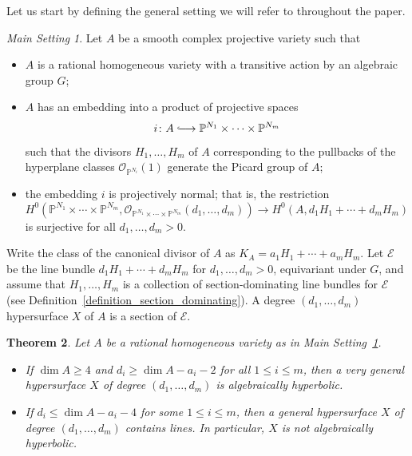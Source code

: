 \documentclass[10pt,a4paper]{article}
\numberwithin{equation}{section}
\newtheorem{theorem}{Theorem}[section]
\theoremstyle{definition}
\theoremstyle{remark}
\newtheorem{setting}[theorem]{Main Setting}
\newcommand{\cO}{\mathcal{O}}
\renewcommand{\P}{\mathbb{P}}
\newcommand{\longhookrightarrow}{\lhook\joinrel\longrightarrow}
\newcommand{\lra}{\longrightarrow}
\begin{document}
\setcounter{section}{1}
\setcounter{theorem}{2}

Let us start by defining the general setting we will refer to throughout the paper.

\begin{setting}\label{main_setting}
    Let $A$ be a smooth complex projective variety such that
    \begin{itemize}
        \item $A$ is a rational homogeneous variety with a transitive action by an algebraic group $G$;
        \item $A$ has an embedding into a product of projective spaces
        \[ i\colon A\longhookrightarrow \P^{N_1}\times \cdots \times \P^{N_m} \]
        such that the divisors $H_1, \hdots , H_m$ of $A$ corresponding to the pullbacks of the hyperplane classes $\cO_{\P^{N_i}}(1)$ generate the Picard group of $A$;
        \item the embedding $i$ is projectively normal; that is, the restriction
        \[ H^0\left (\P^{N_1}\times \cdots \times \P^{N_m}, \cO_{\P^{N_1}\times \cdots \times \P^{N_m}}(d_1,\ldots ,d_m)\right )\lra H^0(A,d_1H_1+\cdots +d_mH_m) \]
        is surjective for all $d_1,\ldots,d_m > 0$.
    \end{itemize}

    Write the class of the canonical divisor of $A$ as $K_A = a_1H_1 + \cdots + a_mH_m$. Let $\mathcal{E}$ be the line bundle $d_1H_1 + \cdots + d_mH_m$ for $d_1,\hdots ,d_m >0$, equivariant under $G$, and assume that $H_1, \hdots , H_m$ is a collection of section-dominating line bundles for $\mathcal{E}$ (see Definition~\ref{definition_section_dominating}). A degree $(d_1, \hdots , d_m)$ hypersurface $X$ of $A$ is a section of $\mathcal{E}$.
\end{setting}


\begin{theorem}\label{main_theorem} Let $A$ be a rational homogeneous variety as in Main Setting~\ref{main_setting}.
    \begin{itemize}
        \item If $\dim A\ge 4$ and $d_i\ge \dim A-a_i-2$ for all $1\le i\le m$, then a very general hypersurface $X$ of degree $(d_1, \hdots, d_m)$ is algebraically hyperbolic.
        \item If $d_i\le \dim A - a_i - 4$ for some $1\le i\le m$, then a general hypersurface $X$ of degree $(d_1, \hdots, d_m)$ contains lines. In particular, $X$ is not algebraically hyperbolic.
    \end{itemize}
\end{theorem}
\end{document}
